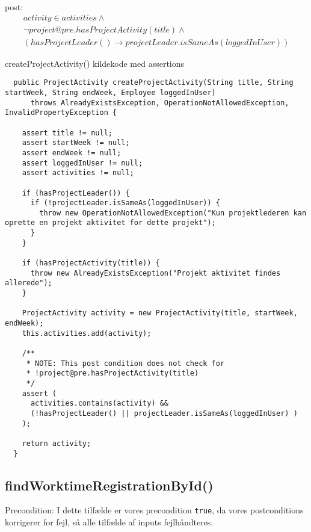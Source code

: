 post: 
\begin{equation}
\begin{gathered}
    activity \in activities \wedge \\
    \neg project@pre.hasProjectActivity(title) \wedge \\
    (hasProjectLeader() \to projectLeader.isSameAs(loggedInUser))
\end{gathered}
\end{equation}

\begin{listing}[H]
    \centering
    \caption{createProjectActivity() kildekode med assertions}\label{lst:create_project_activity_assertions}
    \begin{verbatim}
  public ProjectActivity createProjectActivity(String title, String startWeek, String endWeek, Employee loggedInUser)
      throws AlreadyExistsException, OperationNotAllowedException, InvalidPropertyException {

    assert title != null;
    assert startWeek != null;
    assert endWeek != null;
    assert loggedInUser != null;
    assert activities != null;

    if (hasProjectLeader()) {
      if (!projectLeader.isSameAs(loggedInUser)) {
        throw new OperationNotAllowedException("Kun projektlederen kan oprette en projekt aktivitet for dette projekt");
      }
    }

    if (hasProjectActivity(title)) {
      throw new AlreadyExistsException("Projekt aktivitet findes allerede");
    }

    ProjectActivity activity = new ProjectActivity(title, startWeek, endWeek);
    this.activities.add(activity);

    /**
     * NOTE: This post condition does not check for 
     * !project@pre.hasProjectActivity(title)
     */
    assert (
      activities.contains(activity) &&
      (!hasProjectLeader() || projectLeader.isSameAs(loggedInUser) )
    );

    return activity;
  }
    \end{verbatim}
\end{listing}


\subsection{findWorktimeRegistrationById()} \label{sec:contract_findd_work}
\noindent Precondition: I dette tilfælde er vores precondition \texttt{true}, da vores postconditions korrigerer for fejl, så alle tilfælde af inputs fejlhåndteres.

